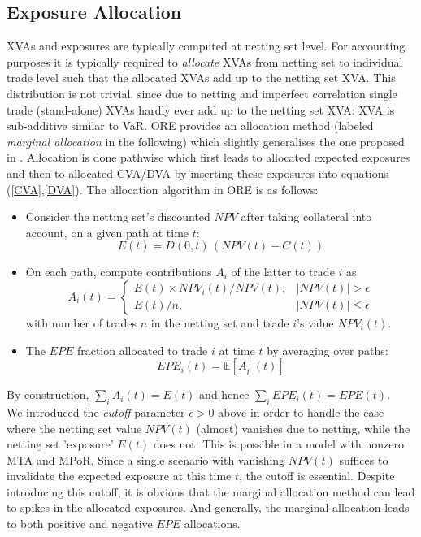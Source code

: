 \documentclass[12pt, a4paper]{article}
\newcommand\E{\ensuremath{\mathbb{E}}}
\newcommand{\NPV}{\mathit{NPV}}
\newcommand{\EPE}{\mathit{EPE}}
\begin{document}
{\begin{appendix}
\subsection{Exposure Allocation}\label{sec:app_allocation}

XVAs and exposures are typically computed at netting set level. For accounting purposes it is typically required to {\em
  allocate} XVAs from netting set to individual trade level such that the allocated XVAs add up to the netting set
XVA. This distribution is not trivial, since due to netting and imperfect correlation single trade (stand-alone) XVAs
hardly ever add up to the netting set XVA: XVA is sub-additive similar to VaR. ORE provides an allocation method
(labeled {\em marginal allocation } in the following) which slightly generalises the one proposed in
\cite{PykhtinRosen}. Allocation is done pathwise which first leads to allocated expected exposures and then to allocated
CVA/DVA by inserting these exposures into equations (\ref{CVA},\ref{DVA}). The allocation algorithm in ORE is as
follows:
\begin{itemize}
\item Consider the netting set's discounted $\NPV$ after taking collateral into account, on a given path at time $t$:
$$
E(t)=D(0,t)\,(\NPV(t)-C(t))
$$ 
\item On each path, compute contributions $A_i$ of the latter to trade $i$ as
$$
A_{i} (t) = \left\{ \begin{array}{ll} 
E(t) \times \NPV_{i}(t) / \NPV(t), & |\NPV(t)| > \epsilon \\
E(t) / n, & |\NPV(t)| \le \epsilon
\end{array}
\right. 
$$
with number of trades $n$ in the netting set and trade $i$'s value $\NPV_i(t)$.
\item The $\EPE$ fraction allocated to trade $i$ at time $t$ by averaging over paths:
$$
\EPE_i(t) = \E\left[ A_i^+(t) \right]
$$
\end{itemize}
By construction, $\sum_i A_i(t) = E(t)$ and hence $\sum_i \EPE_i(t) = \EPE(t)$.\\

We introduced the {\em cutoff } parameter $\epsilon>0$ above in order to handle the case where the netting set value
$\NPV(t)$ (almost) vanishes due to netting, while the netting set 'exposure' $E(t)$ does not. This is possible in a
model with nonzero MTA and MPoR. Since a single scenario with vanishing $\NPV(t)$ suffices to invalidate the expected
exposure at this time $t$, the cutoff is essential. Despite introducing this cutoff, it is obvious that the marginal
allocation method can lead to spikes in the allocated exposures. And generally, the marginal allocation leads to both
positive and negative $\EPE$ allocations.


\end{appendix}}
\end{document}
